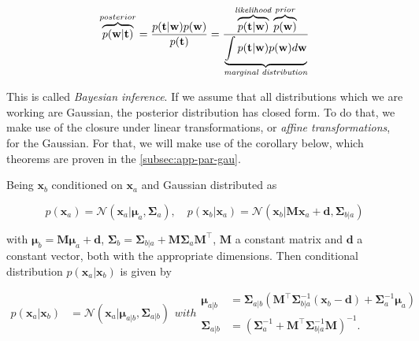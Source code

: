 \documentclass[11pt]{article} %
\begin{document}
\begin{equation}
   \overbrace{p(\mathbf{w}|\mathbf{t})}^{posterior} = \frac{p(\mathbf{t}|\mathbf{w}) p(\mathbf{w})}{p(\mathbf{t})} = \frac{\overbrace{p(\mathbf{t}|\mathbf{w})}^{\text{\textit{likelihood}}} \overbrace{p(\mathbf{w})}^{\text{\textit{prior}}}}{\underbrace{\int p(\mathbf{t}|\mathbf{w}) p(\mathbf{w}) d\mathbf{w}}_{\text{\textit{marginal distribution}}}}
\end{equation}

This is called \textit{Bayesian inference}. If we assume that all distributions which we are working are Gaussian, the posterior distribution has closed form. To do that, we make use of the closure under linear transformations, or \textit{affine transformations}, for the Gaussian. For that, we will make use of the corollary below, which theorems are proven in the \autoref{subsec:app-par-gau}.

\begin{corollary}

   Being $\mathbf{x}_b$ conditioned on $\mathbf{x}_a$ and Gaussian distributed as

   \begin{equation}
     p\left(\mathbf{x}_{a}\right)=\mathcal{N}\left(\mathbf{x}_{a} | \boldsymbol{\mu}_{a}, \boldsymbol{\Sigma}_{a}\right), \quad p\left(\mathbf{x}_{b} | \mathbf{x}_{a}\right)=\mathcal{N}\left(\mathbf{x}_{b} | \mathbf{M} \mathbf{x}_{a}+\mathbf{d}, \boldsymbol{\Sigma}_{b | a}\right)
   \end{equation}

   with $\boldsymbol{\mu}_{b} =\mathbf{M} \boldsymbol{\mu}_{a}+\mathbf{d}$, $\boldsymbol{\Sigma}_{b} =\boldsymbol{\Sigma}_{b | a}+\mathbf{M} \boldsymbol{\Sigma}_{a} \mathbf{M}^\top$, $\mathbf{M}$ a constant matrix and $\mathbf{d}$ a constant vector, both with the appropriate dimensions. Then conditional distribution $p(\mathbf{x}_a|\mathbf{x}_b)$ is given by

   \begin{subequations}
   
   \begin{align}
     p\left(\mathbf{x}_{a} | \mathbf{x}_{b}\right)&=\mathcal{N}\left(\mathbf{x}_{a} | \boldsymbol{\mu}_{a | b}, \boldsymbol{\Sigma}_{a | b}\right)
   \end{align}
   with
   \begin{align}
       \boldsymbol{\mu}_{a | b}&=\boldsymbol{\Sigma}_{a | b}\left(\mathbf{M}^\top \boldsymbol{\Sigma}_{b | a}^{-1}\left(\mathbf{x}_{b}-\mathbf{d}\right)+\boldsymbol{\Sigma}_{a}^{-1} \boldsymbol{\mu}_{a}\right) \\ \boldsymbol{\Sigma}_{a | b}&=\left(\boldsymbol{\Sigma}_{a}^{-1}+\mathbf{M}^\top \boldsymbol{\Sigma}_{b | a}^{-1} \mathbf{M}\right)^{-1}.
   \end{align}
 \end{subequations}
 \end{corollary}
\end{document}
